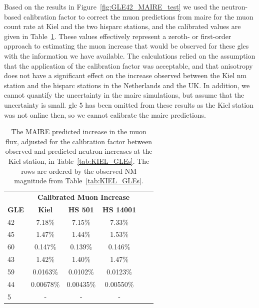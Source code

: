 Based on the results in Figure~\ref{fig:GLE42_MAIRE_test} we used the neutron-based calibration factor to correct the muon predictions from \gls{maire} for the muon count rate at Kiel and the two \gls{hisparc} stations, and the calibrated values are given in Table~\ref{tab:MAIRE_muons}. These values effectively represent a zeroth- or first-order approach to estimating the muon increase that would be observed for these \glspl{gle} with the information we have available. The calculations relied on the assumption that the application of the calibration factor was acceptable, and that anisotropy does not have a significant effect on the increase observed between the Kiel \gls{nm} station and the \gls{hisparc} stations in the Netherlands and the UK. In addition, we cannot quantify the uncertainty in the \gls{maire} simulations, but assume that the uncertainty is small. \gls{gle} 5 has been omitted from these results as the Kiel station was not online then, so we cannot calibrate the \gls{maire} predictions. %


\begin{table}[ht!]
	\begin{center}
		\caption{The MAIRE predicted increase in the muon flux, adjusted for the calibration factor between observed and predicted neutron increases at the Kiel station, in Table~\ref{tab:KIEL_GLEs}. The rows are ordered by the observed NM magnitude from Table~\ref{tab:KIEL_GLEs}.}
		\label{tab:MAIRE_muons}
		\begin{tabular}{l c c c c c}
			\hline
			&  \multicolumn{3}{c}{\bf Calibrated Muon Increase} \\
			{\bf GLE} & {\bf Kiel} & {\bf HS 501} & {\bf HS 14001} \\
			\hline
			42 & 7.18\%    & 7.15\%    & 7.33\%  \\
			45 & 1.47\%    & 1.44\%    & 1.53\%  \\
			60 & 0.147\%   & 0.139\%   & 0.146\%  \\
			43 & 1.42\%    & 1.40\%    & 1.47\%  \\
			59 & 0.0163\%  & 0.0102\%  & 0.0123\%  \\
			44 & 0.00678\% & 0.00435\% & 0.00550\%  \\
			5 & - & - & - \\
			\hline
		\end{tabular}
	\end{center}
\end{table}



